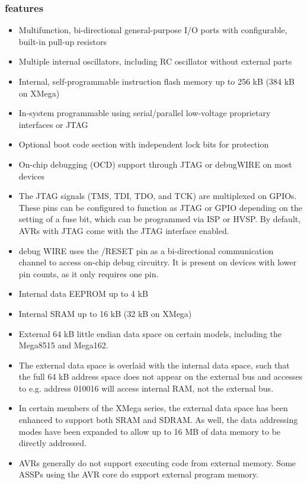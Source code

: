 \documentclass[12pt]{article}
\begin{document}
\subsubsection{features}
\begin{itemize}
\item Multifunction, bi-directional general-purpose I/O ports with configurable, built-in pull-up resistors
\item Multiple internal oscillators, including RC oscillator without external parts
\item  Internal, self-programmable instruction flash memory up to 256 kB (384 kB on XMega)
\item  In-system programmable using serial/parallel low-voltage proprietary interfaces or JTAG
\item  Optional boot code section with independent lock bits for protection
\item  On-chip debugging (OCD) support through JTAG or debugWIRE on most devices
\item  The JTAG signals (TMS, TDI, TDO, and TCK) are multiplexed on GPIOs. These pins can be configured to function as JTAG or GPIO depending on the setting of a fuse bit, which can be programmed via ISP or HVSP. By default, AVRs with JTAG come with the JTAG interface enabled.
\item debug WIRE uses the /RESET pin as a bi-directional communication channel to access on-chip debug circuitry. It is present on devices with lower pin counts, as it only requires one pin.
\item  Internal data EEPROM up to 4 kB
\item  Internal SRAM up to 16 kB (32 kB on XMega)
\item  External 64 kB little endian data space on certain models, including the Mega8515 and Mega162.
\item  The external data space is overlaid with the internal data space, such that the full 64 kB address space does not appear on the external bus and accesses to e.g. address 010016 will access internal RAM, not the external bus.
\item  In certain members of the XMega series, the external data space has been enhanced to support both SRAM and SDRAM. As well, the data addressing modes have been expanded to allow up to 16 MB of data memory to be directly addressed.
\item AVRs generally do not support executing code from external memory. Some ASSPs using the AVR core do support external program memory.

\end{itemize}
\end{document}
